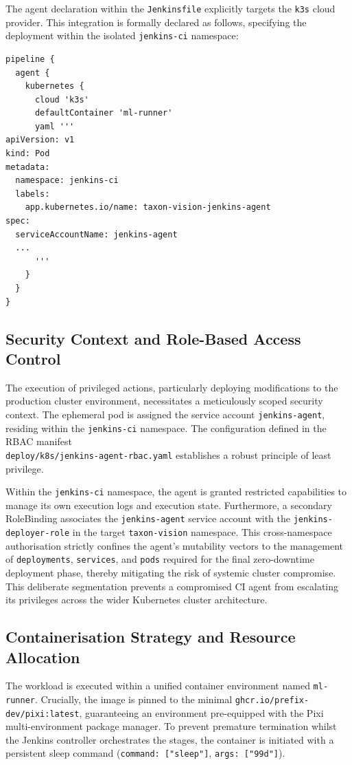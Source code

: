 The agent declaration within the \texttt{Jenkinsfile} explicitly targets the \texttt{k3s} cloud provider. This integration is formally declared as follows, specifying the deployment within the isolated \texttt{jenkins-ci} namespace:

\begin{verbatim}
pipeline {
  agent {
    kubernetes {
      cloud 'k3s'
      defaultContainer 'ml-runner'
      yaml '''
apiVersion: v1
kind: Pod
metadata:
  namespace: jenkins-ci
  labels:
    app.kubernetes.io/name: taxon-vision-jenkins-agent
spec:
  serviceAccountName: jenkins-agent
  ...
      '''
    }
  }
}
\end{verbatim}

\subsection{Security Context and Role-Based Access Control}

The execution of privileged actions, particularly deploying modifications to the production cluster environment, necessitates a meticulously scoped security context. The ephemeral pod is assigned the service account \texttt{jenkins-agent}, residing within the \texttt{jenkins-ci} namespace. The configuration defined in the RBAC manifest\\\texttt{deploy/k8s/jenkins-agent-rbac.yaml} establishes a robust principle of least privilege.

Within the \texttt{jenkins-ci} namespace, the agent is granted restricted capabilities to manage its own execution logs and execution state. Furthermore, a secondary RoleBinding associates the \texttt{jenkins-agent} service account with the \texttt{jenkins-deployer-role} in the target \texttt{taxon-vision} namespace. This cross-namespace authorisation strictly confines the agent's mutability vectors to the management of \texttt{deployments}, \texttt{services}, and \texttt{pods} required for the final zero-downtime deployment phase, thereby mitigating the risk of systemic cluster compromise. This deliberate segmentation prevents a compromised CI agent from escalating its privileges across the wider Kubernetes cluster architecture.

\subsection{Containerisation Strategy and Resource Allocation}

The workload is executed within a unified container environment named \texttt{ml-runner}. Crucially, the image is pinned to the minimal \texttt{ghcr.io/prefix-dev/pixi:latest}, guaranteeing an environment pre-equipped with the Pixi multi-environment package manager. To prevent premature termination whilst the Jenkins controller orchestrates the stages, the container is initiated with a persistent sleep command (\texttt{command: ["sleep"]}, \texttt{args: ["99d"]}).

